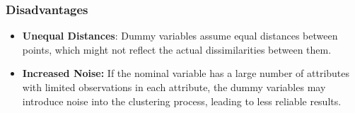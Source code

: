     \subsubsection{Disadvantages}
        \begin{itemize}
            \item \textbf{Unequal Distances}: Dummy variables assume equal distances between points, which might not reflect the actual dissimilarities between them. 
            
            \item \textbf{Increased Noise:} If the nominal variable has a large number of attributes with limited observations in each attribute, the dummy variables may introduce noise into the clustering process, leading to less reliable results.
        \end{itemize}